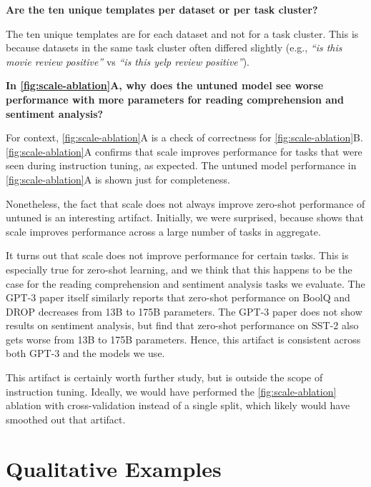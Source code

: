 \vspace{4mm}
\textbf{Are the ten unique templates per dataset or per task cluster?} 

The ten unique templates are for each dataset and not for a task cluster. This is because datasets in the same task cluster often differed slightly (e.g., \textit{``is this movie review positive''} vs \textit{``is this yelp review positive''}).

\vspace{4mm}
\textbf{In \cref{fig:scale-ablation}A, why does the untuned \baselm{} model see worse performance with more parameters for reading comprehension and sentiment analysis?}

For context, \cref{fig:scale-ablation}A is a check of correctness for \cref{fig:scale-ablation}B. \cref{fig:scale-ablation}A confirms that scale improves performance for tasks that were seen during instruction tuning, as expected. The untuned \baselm{} model performance in \cref{fig:scale-ablation}A is shown just for completeness.

Nonetheless, the fact that scale does not always improve zero-shot performance of untuned \baselm{} is an interesting artifact. Initially, we were surprised, because \citet{brown2020language} shows that scale improves performance across a large number of tasks in aggregate.

It turns out that scale does not improve performance for certain tasks. This is especially true for zero-shot learning, and we think that this happens to be the case for the reading comprehension and sentiment analysis tasks we evaluate. The GPT-3 paper itself similarly reports that zero-shot performance on BoolQ and DROP decreases from 13B to 175B parameters. The GPT-3 paper does not show results on sentiment analysis, but \citet{holtzman-etal-2021-surface} find that zero-shot performance on SST-2 also gets worse from 13B to 175B parameters. Hence, this artifact is consistent across both GPT-3 and the models we use.

This artifact is certainly worth further study, but is outside the scope of instruction tuning. 
Ideally, we would have performed the \cref{fig:scale-ablation} ablation with cross-validation instead of a single split, which likely would have smoothed out that artifact.

\section{Qualitative Examples}\label{sec:qualitative}

